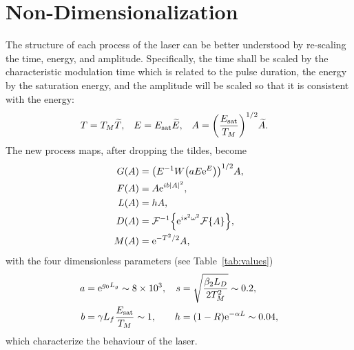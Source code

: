 \section{Non-Dimensionalization}

%
%
%

The structure of each process of the laser can be better understood by re-scaling the time, energy, and amplitude. Specifically, the time shall be scaled by the characteristic modulation time which is related to the pulse duration, the energy by the saturation energy, and the amplitude will be scaled so that it is consistent with the energy:
\begin{align*}
	T &= T_M \widetilde{T},& E &= \Es \widetilde{E},& A &= \left( \frac{\Es}{T_M} \right)^{1/2} \widetilde{A}.
\end{align*}
The new process maps, after dropping the tildes, become
\begin{subequations}
\label{eq:effects}
\begin{align}
\label{eq:gain}
G(A) &= \left(E^{-1} W \left( a E \textrm{e}^{E}\right) \right)^{1/2} A, \\
\label{eq:fibre}
F(A) &= A \textrm{e}^{i b |A|^2}, \\
\label{eq:loss}
L(A) &= h A, \\
\label{eq:disp}
D(A) &= \FTi{\textrm{e}^{i s^2 \omega^2} \FT{A}}, \\
\label{eq:mod}
M(A) &= \textrm{e}^{-T^2 / 2} A,
\end{align}
\end{subequations}
with the four dimensionless parameters (see Table~\ref{tab:values})
\begin{align*}
	a &= \textrm{e}^{g_0 L_g} \sim 8 \times 10^3,& s &= \sqrt{\frac{\beta_2 L_D}{2 T_M^2}} \sim 0.2, \\
	b &= \gamma L_f \frac{E_{\textrm{sat}}}{T_M} \sim 1,& h &= (1 - R) \textrm{e}^{-\alpha L} \sim 0.04,
\end{align*}
which characterize the behaviour of the laser.


